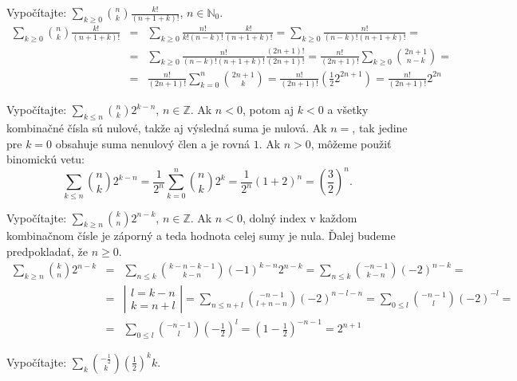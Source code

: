 
\pr Vypočítajte: $\sum_{k\geq0} {n \choose k}\frac{k!}{\left(n+1+k\right)!}$, $n\in \mathbb{N}_0$.
\begin{eqnarray*}
\sum_{k\geq0} {n \choose k}\frac{k!}{\left(n+1+k\right)!} &=& \sum_{k\geq0} \frac{n!}{k!\left(n-k\right)!}\frac{k!}{\left(n+1+k\right)!} = \sum_{k\geq0}\frac{n!}{\left(n-k\right)!\left(n+1+k\right)!} =\\
&=& \sum_{k\geq0}\frac{n!}{\left(n-k\right)!\left(n+1+k\right)!}\frac{\left(2n+1\right)!}{\left(2n+1\right)!} = \frac{n!}{\left(2n+1\right)!}\sum_{k\geq0} {2n+1 \choose n-k} =\\
&=& \frac{n!}{\left(2n+1\right)!}\sum_{k=0}^n {2n+1 \choose k} = \frac{n!}{\left(2n+1\right)!}\left(\frac12 2^{2n+1}\right) = \frac{n!}{\left(2n+1\right)!}2^{2n}
\end{eqnarray*}

\pr Vypočítajte: $\sum_{k \leq n}{n \choose k}2^{k-n}$, $n \in \mathbb{Z}$.
 Ak $n<0$, potom aj $k<0$ a všetky kombinačné čísla sú nulové, takže aj výsledná suma je nulová. Ak $n=$, tak jedine pre $k=0$ obsahuje suma nenulový člen a je rovná $1$. Ak $n>0$, môžeme použiť binomickú vetu:
$$
\sum_{k \leq n}{n \choose k}2^{k-n} = \frac1{2^n} \sum_{k=0}^n{n \choose k}2^k = \frac1{2^n} \left(1+2\right)^n = \left(\frac32\right)^n.
$$

\pr Vypočítajte: $\sum_{k \geq n}{k \choose n}2^{n-k}$, $n \in \mathbb{Z}$.
 Ak $n<0$, dolný index v každom kombinačnom čísle je záporný a teda hodnota celej sumy je nula. Ďalej budeme predpokladať, že $n\geq0$.
\begin{eqnarray*}
\sum_{k \geq n}{k \choose n}2^{n-k} &=& \sum_{n\leq k}{k-n-k-1 \choose k-n}\left(-1\right)^{k-n}2^{n-k} = \sum_{n\leq k}{-n-1 \choose k-n}\left(-2\right)^{n-k} = \\
&=& \left |\begin{array}{l}
l = k-n\\
k = n+l
\end{array}\right| = \sum_{n\leq n+l}{-n-1 \choose l+n-n}\left(-2\right)^{n-l-n} = \sum_{0 \leq l} {-n-1\choose l}\left(-2\right)^{-l} = \\
&=& \sum_{0\leq l}{-n-1 \choose l} \left(-\frac12\right)^l = \left(1 - \frac12\right)^{-n-1} = 2^{n+1}
\end{eqnarray*}

\pr Vypočítajte: $\sum_k{-\frac12 \choose k}\left(\frac12\right)^k k$.


